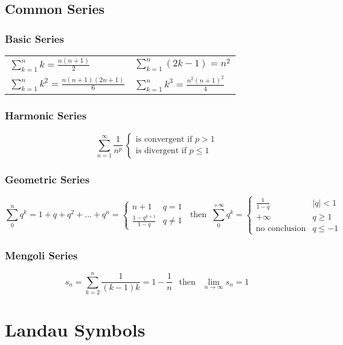 \subsection{Common Series}
\subsubsection{Basic Series}

\begin{tabular}{ l l }
$ \displaystyle \sum_{k=1}^n k = \frac{n(n+1)}{2} $ &
$ \displaystyle \sum_{k=1}^n (2k-1) = n^2 $ \\ [1.5em]
$ \displaystyle \sum_{k=1}^n k^2 = \frac{n(n+1)(2n+1)}{6} $ & 
$ \displaystyle \sum_{k=1}^n k^3 = \frac{n^2(n+1)^2}{4} $
\end{tabular}

\subsubsection{Harmonic Series}
\[
\sum_{n=1}^\infty \frac{1}{n^p} ~ \begin{cases}
									\text{is convergent if } p>1 \\
									\text{is divergent if } p\leq1
									\end{cases}
\]

\subsubsection{Geometric Series}
\[
\sum_{0}^{n}q^k=1+q+q^2+...+q^n= \begin{cases}
									n+1 & q=1 \\
									\frac{1-q^{k+1}}{1-q} & q\ne1
								 \end{cases}
~ \text{ then } ~
\sum_{0}^{+\infty}q^k= \begin{cases}
\frac{1}{1-q} & \left|q\right|<1 \\
+\infty & q\ge1 \\
\text{no conclusion} & q\le-1
\end{cases}
\]

\subsubsection{Mengoli Series}
\[
s_n=\sum_{k=2}^{n}\frac{1}{(k-1)k}=1-\frac{1}{n} ~~ \text{ then } ~~  \lim_{n\rightarrow\infty}s_n=1
\]

\section{Landau Symbols}
